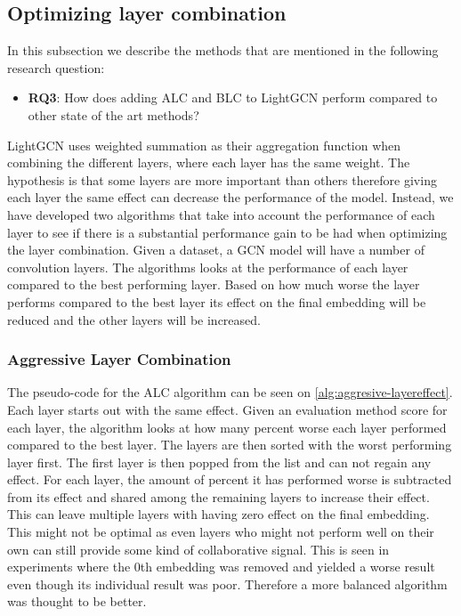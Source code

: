 \subsection{Optimizing layer combination}\label{fredsplit}
In this subsection we describe the methods that are mentioned in the following research question:
\begin{itemize}
    \item \textbf{RQ3}: How does adding ALC and BLC to LightGCN perform compared to other state of the art methods?
\end{itemize}
LightGCN uses weighted summation as their aggregation function when combining the different layers, where each layer has the same weight.
The hypothesis is that some layers are more important than others therefore giving each layer the same effect can decrease the performance of the model.
Instead, we have developed two algorithms that take into account the performance of each layer to see if there is a substantial performance gain to be had when optimizing the layer combination.
Given a dataset, a GCN model will have a number of convolution layers.
The algorithms looks at the performance of each layer compared to the best performing layer.
Based on how much worse the layer performs compared to the best layer its effect on the final embedding will be reduced and the other layers will be increased.

\subsubsection{Aggressive Layer Combination}
The pseudo-code for the ALC algorithm can be seen on \autoref{alg:aggresive-layereffect}.
Each layer starts out with the same effect.
Given an evaluation method score for each layer, the algorithm looks at how many percent worse each layer performed compared to the best layer.
The layers are then sorted with the worst performing layer first.
The first layer is then popped from the list and can not regain any effect.
For each layer, the amount of percent it has performed worse is subtracted from its effect and shared among the remaining layers to increase their effect.
This can leave multiple layers with having zero effect on the final embedding.
\\
This might not be optimal as even layers who might not perform well on their own can still provide some kind of collaborative signal.
This is seen in experiments where the 0th embedding was removed and yielded a worse result even though its individual result was poor.
Therefore a more balanced algorithm was thought to be better.

